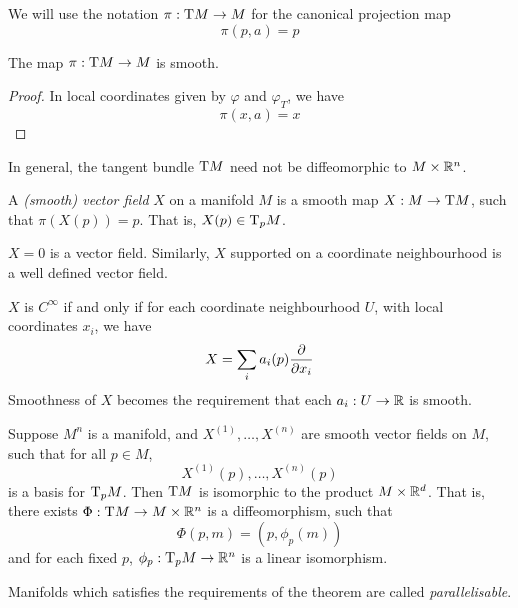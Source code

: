 \documentclass{article}
\begin{document}
\lec

We will use the notation \(\pi : \mathrm{T} M \to M\) for the canonical projection map
\[\pi(p, a) = p\]

\begin{proposition}
    The map \(\pi : \mathrm{T} M \to M\) is smooth.
\end{proposition}

\begin{proof}
    In local coordinates given by \(\varphi\) and \(\varphi_T\), we have
    \[\pi(x, a) = x\]
\end{proof}

\begin{remark}
    In general, the tangent bundle \(\mathrm{T} M\) need not be diffeomorphic to \(M \times \mathbb{R}^n\).
\end{remark}

\begin{definition}
     A \emph{(smooth) vector field} \(X\) on a manifold \(M\) is a smooth map \(X : M \to \mathrm{T} M\), such that \(\pi(X(p)) = p\). That is, \(X(p) \in \mathrm{T}_pM\).
\end{definition}

\begin{example}
    \(X = 0\) is a vector field. Similarly, \(X\) supported on a coordinate neighbourhood is a well defined vector field.
\end{example}

\(X\) is \(C^\infty\) if and only if for each coordinate neighbourhood \(U\), with local coordinates \(x_i\), we have
\[X = \sum_i a_i(p) \pdv{x_i}\]
Smoothness of \(X\) becomes the requirement that each \(a_i : U \to \mathbb{R}\) is smooth.

\begin{theorem}
    \label{thm:parallelisable-iff-exists-lin-indep-vf}
    Suppose \(M^n\) is a manifold, and \(X^{(1)}, \dots, X^{(n)}\) are smooth vector fields on \(M\), such that for all \(p \in M\),
    \[X^{(1)}(p), \dots, X^{(n)}(p)\]
    is a basis for \(\mathrm{T}_pM\). Then \(\mathrm{T} M\) is isomorphic to the product \(M \times \mathbb{R}^d\). That is, there exists \(\Phi : \mathrm{T} M \to M \times \mathbb{R}^n\) is a diffeomorphism, such that
    \[\Phi(p, m) = (p, \phi_p(m))\]
    and for each fixed \(p\), \(\phi_p : \mathrm{T}_p M \to \mathbb{R}^n\) is a linear isomorphism.
\end{theorem}

Manifolds which satisfies the requirements of the theorem are called \emph{parallelisable}.
\end{document}
